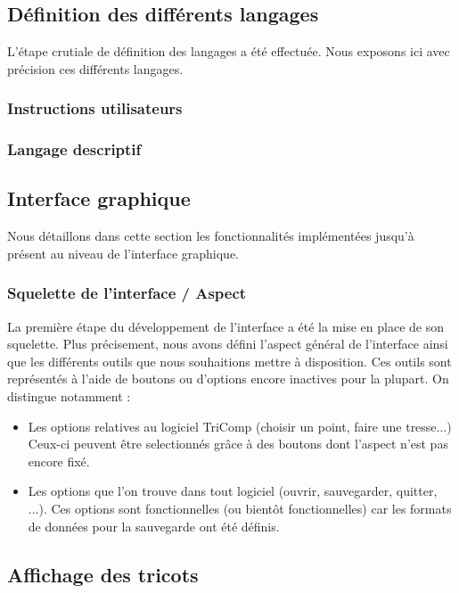 \documentclass{article}
\begin{document}
\subsection{Définition des différents langages}

L'étape crutiale de définition des langages a été effectuée. Nous exposons ici avec précision ces différents langages.

\subsubsection{Instructions utilisateurs}

\subsubsection{Langage descriptif}

\subsection{Interface graphique}

Nous détaillons dans cette section les fonctionnalités implémentées jusqu'à présent au niveau de l'interface graphique.

\subsubsection{Squelette de l'interface / Aspect}

La première étape du développement de l'interface a été la mise en place de son squelette. Plus précisement, nous avons défini l'aspect 
général de l'interface ainsi que les différents outils que nous souhaitions mettre à disposition. Ces outils sont représentés à l'aide de 
boutons ou d'options encore inactives pour la plupart. On distingue notamment :
\begin{itemize}
  \item Les options relatives au logiciel TriComp (choisir un point, faire une tresse...) Ceux-ci peuvent être selectionnés grâce à des 
boutons dont l'aspect n'est pas encore fixé. %
  \item Les options que l'on trouve dans tout logiciel (ouvrir, sauvegarder, quitter, ...). Ces options sont fonctionnelles (ou bientôt 
fonctionnelles) car les formats de données pour la sauvegarde ont été définis.
\end{itemize}

\subsection{Affichage des tricots}
\end{document}
